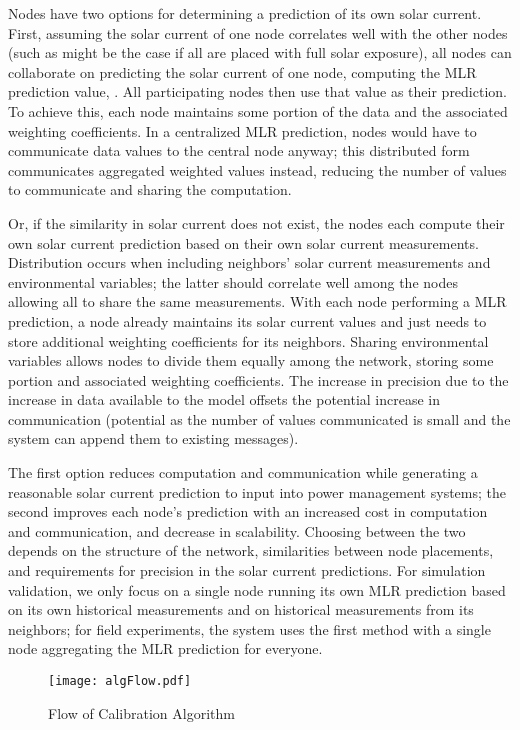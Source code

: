 \documentclass[prodmode,acmtosn]{acmsmall}
\begin{document}
Nodes have two options for determining a prediction of its own solar current.
First, assuming the solar current of one node correlates well with the other nodes (such as might be the case if all are placed with full solar exposure), all nodes can collaborate on predicting the solar current of one node, computing the MLR prediction value, .
All participating nodes then use that value as their prediction.
To achieve this, each node maintains some portion of the data and the associated weighting coefficients.
In a centralized MLR prediction, nodes would have to communicate data values to the central node anyway; this distributed form communicates aggregated weighted values instead, reducing the number of values to communicate and sharing the computation.

Or, if the similarity in solar current does not exist, the nodes each compute their own solar current prediction based on their own solar current measurements.
Distribution occurs when including neighbors' solar current measurements and environmental variables; the latter should correlate well among the nodes allowing all to share the same measurements.
With each node performing a MLR prediction, a node already maintains its solar current values and just needs to store additional weighting coefficients for its neighbors.
Sharing environmental variables allows nodes to divide them equally among the network, storing some portion and associated weighting coefficients.
The increase in precision due to the increase in data available to the model offsets the potential increase in communication (potential as the number of values communicated is small and the system can append them to existing messages).

The first option reduces computation and communication while generating a reasonable solar current prediction to input into power management systems; the second improves each node's prediction with an increased cost in computation and communication, and decrease in scalability.
Choosing between the two depends on the structure of the network, similarities between node placements, and requirements for precision in the solar current predictions.
For simulation validation, we only focus on a single node running its own MLR prediction based on its own historical measurements and on historical measurements from its neighbors; for field experiments, the system uses the first method with a single node aggregating the MLR prediction for everyone.

\begin{figure}[h]
\begin{center}
\texttt{[image: algFlow.pdf]}
\end{center}
\caption{Flow of Calibration Algorithm}
\label{fig:algFlow}
\end{figure}
\end{document}
